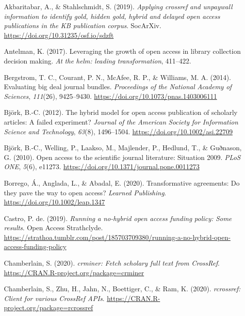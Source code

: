 \documentclass[a4paper,man,floatsintext,longtable,noextraspace,12pt]{apa6}
\newenvironment{CSLReferences}%
  {}%
  {\par}
\begin{document}
\hypertarget{refs}{}
\begin{CSLReferences}{1}{0}
\leavevmode\hypertarget{ref-Akbaritabar_2019}{}%
Akbaritabar, A., \& Stahlschmidt, S. (2019). \emph{Applying crossref and
unpaywall information to identify gold, hidden gold, hybrid and delayed
open access publications in the {KB} publication corpus}. SocArXiv.
\url{https://doi.org/10.31235/osf.io/sdzft}

\leavevmode\hypertarget{ref-antelmann_2017}{}%
Antelman, K. (2017). Leveraging the growth of open access in library
collection decision making. \emph{{At the helm: leading
transformation}}, 411--422.

\leavevmode\hypertarget{ref-Bergstrom_2014}{}%
Bergstrom, T. C., Courant, P. N., McAfee, R. P., \& Williams, M. A.
(2014). Evaluating big deal journal bundles. \emph{Proceedings of the
National Academy of Sciences}, \emph{111}(26), 9425--9430.
\url{https://doi.org/10.1073/pnas.1403006111}

\leavevmode\hypertarget{ref-Bj_rk_2012}{}%
Björk, B.-C. (2012). The hybrid model for open access publication of
scholarly articles: A failed experiment? \emph{Journal of the American
Society for Information Science and Technology}, \emph{63}(8),
1496--1504. \url{https://doi.org/10.1002/asi.22709}

\leavevmode\hypertarget{ref-Bj_rk_2010}{}%
Björk, B.-C., Welling, P., Laakso, M., Majlender, P., Hedlund, T., \&
Guðnason, G. (2010). Open access to the scientific journal literature:
Situation 2009. \emph{{PLoS} {ONE}}, \emph{5}(6), e11273.
\url{https://doi.org/10.1371/journal.pone.0011273}

\leavevmode\hypertarget{ref-Borrego_2020}{}%
Borrego, Á., Anglada, L., \& Abadal, E. (2020). Transformative
agreements: Do they pave the way to open access? \emph{Learned
Publishing}. \url{https://doi.org/10.1002/leap.1347}

\leavevmode\hypertarget{ref-Castro_2019}{}%
Castro, P. de. (2019). \emph{Running a no-hybrid open access funding
policy: Some results}. Open Access Strathclyde.
\url{https://strathoa.tumblr.com/post/185703709380/running-a-no-hybrid-open-access-funding-policy}

\leavevmode\hypertarget{ref-crminer}{}%
Chamberlain, S. (2020). \emph{{crminer}: Fetch scholary full text from
{CrossRef}}. \url{https://CRAN.R-project.org/package=crminer}

\leavevmode\hypertarget{ref-rcrossref}{}%
Chamberlain, S., Zhu, H., Jahn, N., Boettiger, C., \& Ram, K. (2020).
\emph{{rcrossref}: Client for various {CrossRef} {APIs}}.
\url{https://CRAN.R-project.org/package=rcrossref}


\end{CSLReferences}
\end{document}
